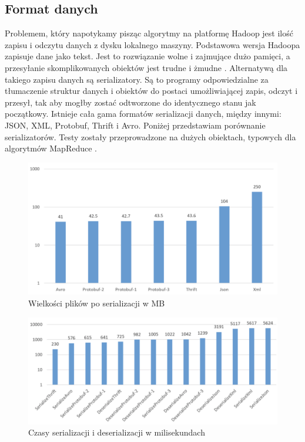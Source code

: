 \documentclass[licencjacka]{pracamgr}
\begin{document}
\subsection{Format danych}

Problemem, który napotykamy pisząc algorytmy na platformę Hadoop jest ilość zapisu i odczytu danych z dysku lokalnego maszyny. Podstawowa wersja Hadoopa zapisuje dane jako tekst. Jest to rozwiązanie wolne i zajmujące dużo pamięci, a przesyłanie skomplikowanych obiektów jest trudne i żmudne \cite{shvachko2010hadoop, white2012hadoop}. Alternatywą dla takiego zapisu danych są serializatory. Są to programy odpowiedzialne za tłumaczenie struktur danych i obiektów do postaci umożliwiającej zapis, odczyt i przesył, tak aby mogłby zostać odtworzone do identycznego stanu jak początkowy. Istnieje cała gama formatów serializacji danych, między innymi: JSON, XML, Protobuf, Thrift i Avro. Poniżej przedstawiam porównanie serializatorów. Testy zostały przeprowadzone na dużych obiektach, typowych dla algorytmów MapReduce \cite{avro, serialization}.

\begin{figure}[H]
    \caption{Wielkości plików po serializacji w MB}
    \includegraphics[width=15cm]{serialization_compression.png}
\end{figure}
\begin{figure}[H]
    \caption{Czasy serializacji i deserializacji w milisekundach}
    \includegraphics[width=15cm]{serialization_time.png}
\end{figure}
\end{document}
